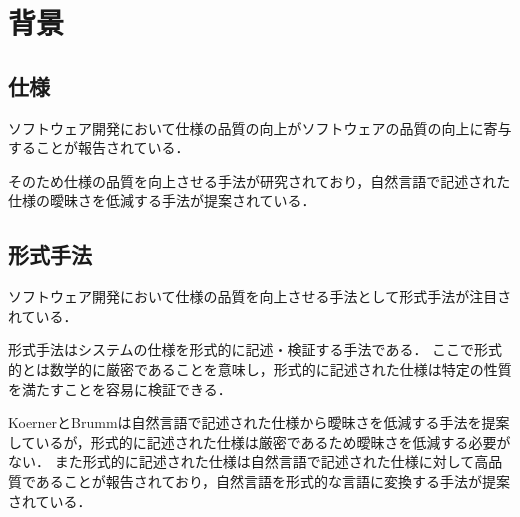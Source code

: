 \documentclass[main]{subfiles}
\begin{document}
\chapter{背景}

\section{仕様}

ソフトウェア開発において仕様の品質の向上がソフトウェアの品質の向上に寄与することが報告されている\cite{knauss:2009}．

そのため仕様の品質を向上させる手法が研究されており，自然言語で記述された仕様の曖昧さを低減する手法が提案されている\cite{koerner:2011}．

\section{形式手法}

ソフトウェア開発において仕様の品質を向上させる手法として形式手法が注目されている\cite{aoki:2018}．

形式手法はシステムの仕様を形式的に記述・検証する手法である．
ここで形式的とは数学的に厳密であることを意味し，形式的に記述された仕様は特定の性質を満たすことを容易に検証できる．

KoernerとBrummは自然言語で記述された仕様から曖昧さを低減する手法を提案しているが，形式的に記述された仕様は厳密であるため曖昧さを低減する必要がない．
また形式的に記述された仕様は自然言語で記述された仕様に対して高品質であることが報告されており\cite{fabbrini:2001}，自然言語を形式的な言語に変換する手法が提案されている\cite{ilieva:2005}．
\end{document}

